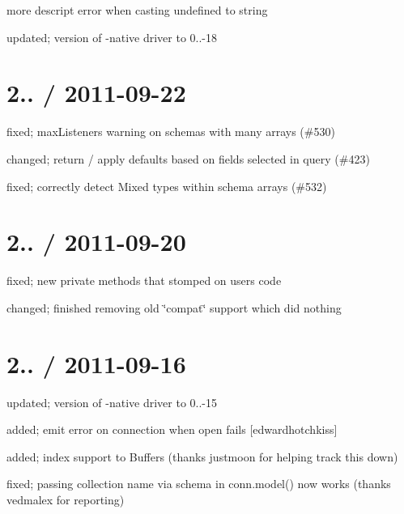 \begin{DoxyItemize}
\item more descript error when casting undefined to string
\item updated; version of -\/native driver to 0..-\/18
\end{DoxyItemize}

\section*{2.. / 2011-\/09-\/22 }


\begin{DoxyItemize}
\item fixed; max\+Listeners warning on schemas with many arrays (\#530)
\item changed; return / apply defaults based on fields selected in query (\#423)
\item fixed; correctly detect Mixed types within schema arrays (\#532)
\end{DoxyItemize}

\section*{2.. / 2011-\/09-\/20 }


\begin{DoxyItemize}
\item fixed; new private methods that stomped on users code
\item changed; finished removing old \char`\"{}compat\char`\"{} support which did nothing
\end{DoxyItemize}

\section*{2.. / 2011-\/09-\/16 }


\begin{DoxyItemize}
\item updated; version of -\/native driver to 0..-\/15
\item added; emit {\ttfamily error} on connection when open fails \mbox{[}edwardhotchkiss\mbox{]}
\item added; index support to Buffers (thanks justmoon for helping track this down)
\item fixed; passing collection name via schema in conn.\+model() now works (thanks vedmalex for reporting)
\end{DoxyItemize}

